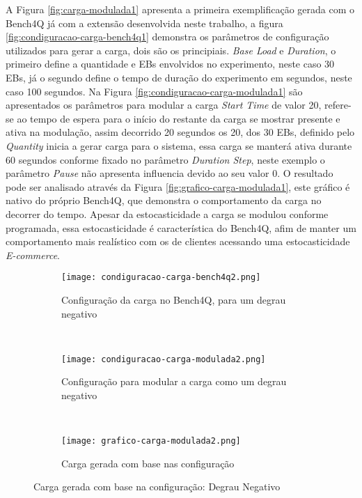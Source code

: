 A Figura \ref{fig:carga-modulada1} apresenta a primeira exemplificação gerada com o Bench4Q já com a extensão desenvolvida neste trabalho, a figura \ref{fig:condiguracao-carga-bench4q1} demonstra os parâmetros de configuração utilizados para gerar a carga, dois são os principiais. \textit{Base Load} e \textit{Duration}, o primeiro define a quantidade e EBs envolvidos no experimento, neste caso 30 EBs, já o segundo define o tempo de duração do experimento em segundos, neste caso 100 segundos. Na Figura \ref{fig:condiguracao-carga-modulada1} são apresentados os parâmetros para modular a carga \textit{Start Time} de valor 20, refere-se ao tempo de espera para o início do restante da carga se mostrar presente e ativa na modulação, assim decorrido 20 segundos os 20, dos 30 EBs, definido pelo \textit{Quantity} inicia a gerar carga para o sistema, essa carga se manterá ativa durante 60 segundos conforme fixado no parâmetro \textit{Duration Step}, neste exemplo o parâmetro \textit{Pause} não apresenta influencia devido ao seu valor 0.
O resultado pode ser analisado através da Figura \ref{fig:grafico-carga-modulada1}, este gráfico é nativo do próprio Bench4Q, que demonstra o comportamento da carga no decorrer do tempo. Apesar da estocasticidade a carga se modulou conforme programada, essa estocasticidade é característica do Bench4Q, afim de manter um comportamento mais realístico com os de clientes acessando uma estocasticidade \textit{E-commerce}.

\begin{figure}[!htb]
	\begin{subfigure}{\linewidth}
		\centering
		\texttt{[image: condiguracao-carga-bench4q2.png]}
		\caption{Configuração da carga no Bench4Q, para um degrau negativo}
		\label{fig:condiguracao-carga-bench4q2}
	\end{subfigure}\\
	\begin{subfigure}{\linewidth}
		\centering
		\texttt{[image: condiguracao-carga-modulada2.png]}
		\caption{Configuração para modular a carga como um degrau negativo}
		\label{fig:condiguracao-carga-modulada2}
	\end{subfigure}\\[1ex]
	\begin{subfigure}{\linewidth}
		\centering
		\texttt{[image: grafico-carga-modulada2.png]}
		\caption{Carga gerada com base nas configuração}
		\label{fig:grafico-carga-modulada2}
	\end{subfigure}
	\caption{Carga gerada com base na configuração: Degrau Negativo}
	\label{fig:carga-modulada2}
	\fautor
\end{figure}

